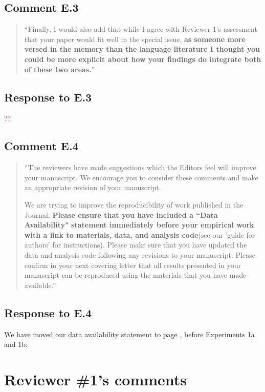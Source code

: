 \documentclass[12pt]{article}
\begin{document}
\setcounter{figure}{10}

\subsection*{Comment E.3}
\begin{quote}
``Finally, I would also add that while I agree with Reviewer 1's assessment that your paper would fit well in the special issue, \textbf{as someone more versed in the memory than the language literature I thought you could be more explicit about how your findings do integrate both of these two areas.}''
\end{quote}

\subsection*{Response to E.3}
\textcolor{red}{??}

\subsection*{Comment E.4}
\begin{quote}
``The reviewers have made suggestions which the Editors feel will improve your manuscript. We encourage you to consider these comments and make an appropriate revision of your manuscript.

We are trying to improve the reproducibility of work published in the Journal. \textbf{Please ensure that you have included a ``Data Availability" statement immediately before your empirical work with a link to materials, data, and analysis code}(see our 'guide for authors' for instructions). Please make sure that you have updated the data and analysis code following any revisions to your manuscript. Please confirm in your next covering letter that all results presented in your manuscript can be reproduced using the materials that you have made available.''
\end{quote}


\subsection*{Response to E.4}
We have moved our data availability statement to page \pageref{statement}, before Experiments 1a and 1b:


\section*{Reviewer \#1's comments} 
\end{document}
